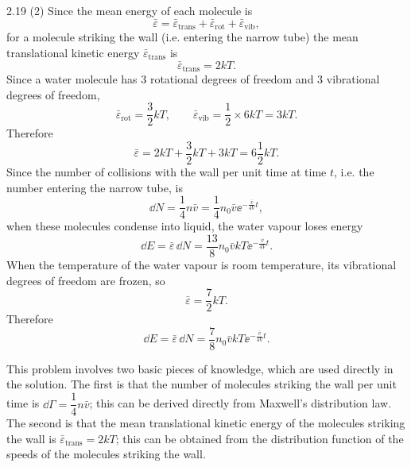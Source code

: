 \begin{solution}{2.19}
(2) Since the mean energy of each molecule is
\begin{equation*}
\bar{\varepsilon} = \bar{\varepsilon}_{\text{trans}} + \bar{\varepsilon}_{\text{rot}}
+ \bar{\varepsilon}_{\text{vib}},
\end{equation*}
for a molecule striking the wall (i.e. entering the narrow tube) the mean translational kinetic
energy $\bar{\varepsilon}_{\text{trans}}$ is
\begin{equation*}
\bar{\varepsilon}_{\text{trans}} = 2kT .
\end{equation*}
Since a water molecule has 3 rotational degrees of freedom and 3 vibrational degrees of freedom,
\begin{equation*}
\bar{\varepsilon}_{\text{rot}} = \frac{3}{2}kT,\qquad
\bar{\varepsilon}_{\text{vib}} = \frac{1}{2}\times 6kT = 3kT .
\end{equation*}
Therefore
\begin{equation*}
\bar{\varepsilon} = 2kT + \frac{3}{2}kT + 3kT = 6\frac{1}{2}kT .
\end{equation*}
Since the number of collisions with the wall per unit time at time $t$, i.e. the number entering
the narrow tube, is
\begin{equation*}
\dd N = \frac{1}{4}n\bar{v} = \frac{1}{4}n_0\bar{v}\ee^{-\frac{\bar{v}}{4V}t},
\end{equation*}
when these molecules condense into liquid, the water vapour loses energy
\begin{equation*}
\dd E = \bar{\varepsilon}\,\dd N = \frac{13}{8}n_0\bar{v}kT\ee^{-\frac{\bar{v}}{4V}t}.
\end{equation*}
When the temperature of the water vapour is room temperature, its vibrational degrees of freedom
are frozen, so
\begin{equation*}
\bar{\varepsilon} = \frac{7}{2}kT .
\end{equation*}
Therefore
\begin{equation*}
\dd E = \bar{\varepsilon}\,\dd N = \frac{7}{8}n_0\bar{v}kT\ee^{-\frac{\bar{v}}{4V}t}.
\end{equation*}

\begin{commentary}
This problem involves two basic pieces of knowledge, which are used directly in the solution.
The first is that the number of molecules striking the wall per unit time is
$\dd\Gamma=\dfrac{1}{4}n\bar{v}$; this can be derived directly from Maxwell's distribution law.
The second is that the mean translational kinetic energy of the molecules striking the wall is
$\bar{\varepsilon}_{\text{trans}}=2kT$; this can be obtained from the distribution function of the
speeds of the molecules striking the wall.
\end{commentary}
\end{solution}

